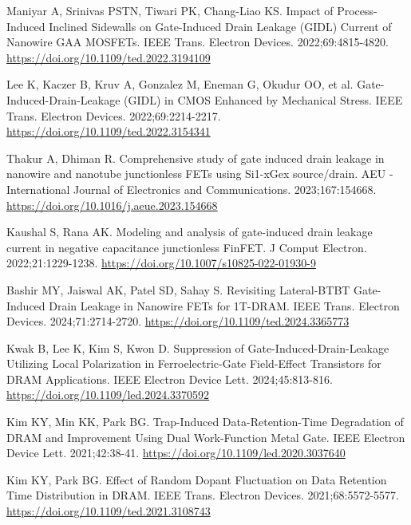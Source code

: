 Maniyar A, Srinivas PSTN, Tiwari PK, Chang-Liao KS. Impact of Process-Induced Inclined Sidewalls on Gate-Induced Drain Leakage (GIDL) Current of Nanowire GAA MOSFETs. IEEE Trans. Electron Devices. 2022;69:4815-4820.
\href{https://doi.org/10.1109/ted.2022.3194109}{https://doi.org/10.1109/ted.2022.3194109}

Lee K, Kaczer B, Kruv A, Gonzalez M, Eneman G, Okudur OO, et al. Gate-Induced-Drain-Leakage (GIDL) in CMOS Enhanced by Mechanical Stress. IEEE Trans. Electron Devices. 2022;69:2214-2217.
\href{https://doi.org/10.1109/ted.2022.3154341}{https://doi.org/10.1109/ted.2022.3154341}

Thakur A, Dhiman R. Comprehensive study of gate induced drain leakage in nanowire and nanotube junctionless FETs using Si1-xGex source/drain. AEU - International Journal of Electronics and Communications. 2023;167:154668.
\href{https://doi.org/10.1016/j.aeue.2023.154668}{https://doi.org/10.1016/j.aeue.2023.154668}

Kaushal S, Rana AK. Modeling and analysis of gate-induced drain leakage current in negative capacitance junctionless FinFET. J Comput Electron. 2022;21:1229-1238.
\href{https://doi.org/10.1007/s10825-022-01930-9}{https://doi.org/10.1007/s10825-022-01930-9}

Bashir MY, Jaiswal AK, Patel SD, Sahay S. Revisiting Lateral-BTBT Gate-Induced Drain Leakage in Nanowire FETs for 1T-DRAM. IEEE Trans. Electron Devices. 2024;71:2714-2720.
\href{https://doi.org/10.1109/ted.2024.3365773}{https://doi.org/10.1109/ted.2024.3365773}

Kwak B, Lee K, Kim S, Kwon D. Suppression of Gate-Induced-Drain-Leakage Utilizing Local Polarization in Ferroelectric-Gate Field-Effect Transistors for DRAM Applications. IEEE Electron Device Lett. 2024;45:813-816.
\href{https://doi.org/10.1109/led.2024.3370592}{https://doi.org/10.1109/led.2024.3370592}

Kim KY, Min KK, Park BG. Trap-Induced Data-Retention-Time Degradation of DRAM and Improvement Using Dual Work-Function Metal Gate. IEEE Electron Device Lett. 2021;42:38-41.
\href{https://doi.org/10.1109/led.2020.3037640}{https://doi.org/10.1109/led.2020.3037640}

Kim KY, Park BG. Effect of Random Dopant Fluctuation on Data Retention Time Distribution in DRAM. IEEE Trans. Electron Devices. 2021;68:5572-5577.
\href{https://doi.org/10.1109/ted.2021.3108743}{https://doi.org/10.1109/ted.2021.3108743}

